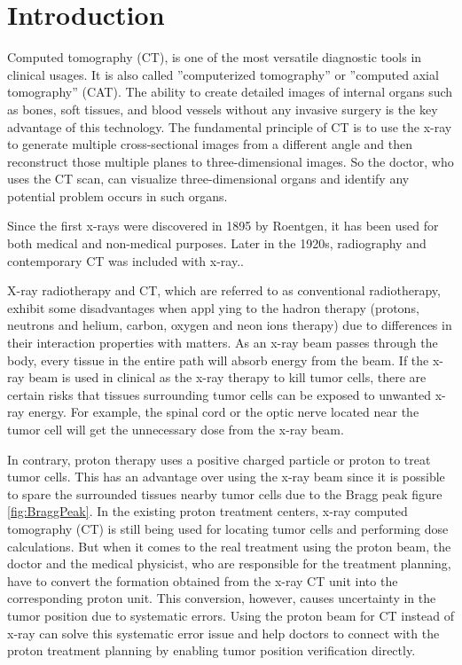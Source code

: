 \documentclass[12pt,a4paper]{article}
\begin{document}
\section{Introduction}

Computed tomography (CT), is one of the most versatile diagnostic tools in clinical usages. It is also called ”computerized tomography” or ”computed axial tomography” (CAT).  The ability to create detailed images of internal organs such as bones, soft tissues, and blood vessels without any invasive surgery is the key advantage of this technology.  The fundamental principle of  CT is to use the x-ray to generate multiple cross-sectional images from a different angle and then reconstruct those multiple planes to three-dimensional images.  So the doctor, who uses the CT scan, can visualize three-dimensional organs and identify any potential problem occurs in such organs.  

Since the first x-rays were discovered in 1895 by Roentgen, it has been used for both medical and non-medical purposes.  Later in the 1920s, radiography and contemporary CT was included with x-ray.\cite{CTandXray}. 

X-ray radiotherapy and CT, which are referred to as conventional radiotherapy, exhibit some disadvantages when appl
ying to the hadron therapy (protons, neutrons and helium, carbon, oxygen and neon ions therapy) \cite{PToverRT} due to differences in their interaction properties with matters.  As an x-ray beam passes through the body, every tissue in the entire path will absorb energy from the beam. If the x-ray beam is used in clinical as the x-ray therapy to kill tumor cells, there are certain risks that tissues surrounding tumor cells can be exposed to unwanted x-ray energy. For example, the spinal cord or the optic nerve located near the tumor cell will get the unnecessary dose from the x-ray beam.

In contrary, proton therapy uses a positive charged particle or proton to treat tumor cells. This has an advantage over using the x-ray beam since it is possible to spare the surrounded tissues nearby tumor cells due to the Bragg peak figure \ref{fig:BraggPeak}.  In the existing proton treatment centers, x-ray computed tomography (CT) is still being used for locating tumor cells and performing dose calculations. But when it comes to the real treatment using the proton beam, the doctor and the medical physicist, who are responsible for the treatment planning, have to convert the formation obtained from the x-ray CT unit into the corresponding proton unit. This conversion, however, causes uncertainty in the tumor position due to systematic errors.  Using the proton beam for CT instead of x-ray can solve this systematic error issue and help doctors to connect with the proton treatment planning by enabling tumor position verification directly.\cite{PTinsteadrRT} 
\end{document}
